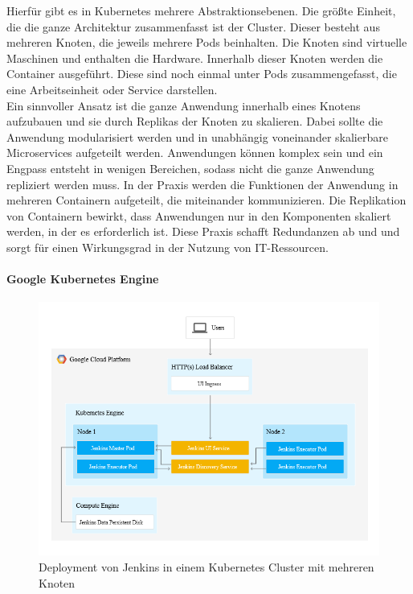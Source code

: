 Hierfür gibt es in Kubernetes mehrere Abstraktionsebenen. Die größte Einheit, die die ganze Architektur zusammenfasst ist der Cluster. Dieser besteht aus mehreren Knoten, die jeweils mehrere Pods beinhalten. Die Knoten sind virtuelle Maschinen und enthalten die Hardware. Innerhalb dieser Knoten werden die Container ausgeführt. Diese sind noch einmal unter Pods zusammengefasst, die eine Arbeitseinheit oder Service darstellen. 
\medskip
\\
Ein sinnvoller Ansatz ist die ganze Anwendung innerhalb eines Knotens aufzubauen und sie durch Replikas der Knoten zu skalieren. Dabei sollte die Anwendung modularisiert werden und in unabhängig voneinander skalierbare Microservices aufgeteilt werden. Anwendungen können komplex sein und ein Engpass entsteht in wenigen Bereichen, sodass nicht die ganze Anwendung repliziert werden muss. In der Praxis werden die Funktionen der Anwendung in mehreren Containern aufgeteilt, die miteinander kommunizieren. Die Replikation von Containern bewirkt, dass Anwendungen nur in den Komponenten skaliert werden, in der es erforderlich ist. Diese Praxis schafft Redundanzen ab und und sorgt für einen Wirkungsgrad in der Nutzung von IT-Ressourcen.


%
\paragraph{Google Kubernetes Engine}

\begin{figure}[htbp]
 \centering
 \includegraphics[width=1.0\textwidth]{gfx/jenkins-kubernetes-architecture.png}
 \caption{Deployment von Jenkins in einem Kubernetes Cluster mit mehreren Knoten \cite{Google:GKEJenkins}\label{fig:gkejenkins}}
\end{figure}

